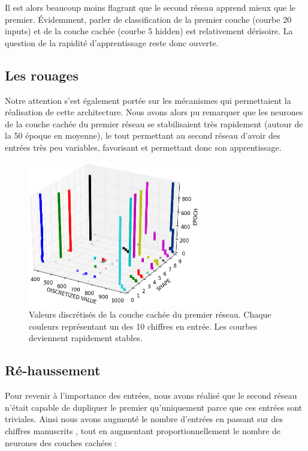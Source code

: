 \documentclass[a4paper,12pt, twoside]{article}
\begin{document}
Il est alors beaucoup moins flagrant que le second réseau apprend mieux que le premier.
Évidemment, parler de classification de la premier couche (courbe 20 inputs) et de la couche 
cachée (courbe 5 hidden) est relativement dérisoire. 
\newline La question de la rapidité d'apprentissage reste donc ouverte.

\subsection{Les rouages}

Notre attention s'est également portée sur les mécanismes qui permettaient la réalisation de cette architecture.
Nous avons alors pu remarquer que les neurones de la couche cachée du premier
réseau se stabilisaient très rapidement (autour de la 50 époque en moyenne), le tout
permettant au second réseau d'avoir des entrées très peu variables, favorisant et permettant
donc son apprentissage.

\begin{figure}[H]
\begin{center}
 \includegraphics[height=240px]{../cleeremans_2007/digit_reco/discretize_cloud.png}
\end{center}
\caption{ Valeurs discrétisés de la couche cachée du premier réseau. Chaque couleurs 
représentant un des 10 chiffres en entrée. Les courbes deviennent rapidement stables.}
\end{figure}


\subsection{Ré-haussement}

Pour revenir à l'importance des entrées, nous avons réalisé que le second réseau
n'était capable de dupliquer le premier qu'uniquement parce que ces entrées 
sont triviales.
Ainsi nous avons augmenté le nombre d'entrées en passant sur des chiffres
manuscrits \cite{Handwritten_256}, tout en augmentant proportionnellement le nombre de 
neurones des couches cachées :
\end{document}
